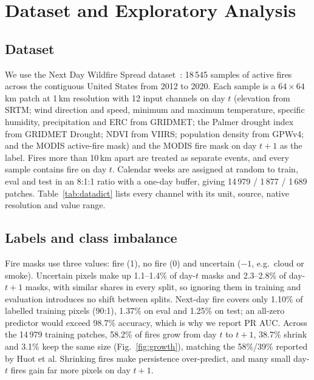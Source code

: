 
\section{Dataset and Exploratory Analysis}
\label{sec:dataset}

\subsection{Dataset}
We use the Next Day Wildfire Spread dataset~\cite{huot2022}: 18\,545 samples of active fires across
the contiguous United States from 2012 to 2020. Each sample is a $64\times64$\,km patch at 1\,km
resolution with 12 input channels on day $t$ (elevation from SRTM; wind direction and speed, minimum
and maximum temperature, specific humidity, precipitation and ERC from GRIDMET; the Palmer drought
index from GRIDMET Drought; NDVI from VIIRS; population density from GPWv4; and the MODIS active-fire
mask) and the MODIS fire mask on day $t+1$ as the label. Fires more than 10\,km apart are treated as
separate events, and every sample contains fire on day $t$. Calendar weeks are assigned at random
to train, eval and test in an 8:1:1 ratio with a one-day buffer, giving 14\,979 / 1\,877 / 1\,689 patches.
Table~\ref{tab:datadict} lists every channel with its unit, source, native resolution and value range.



\subsection{Labels and class imbalance}
Fire masks use three values: fire (1), no fire (0) and uncertain ($-1$, e.g.\ cloud or smoke).
Uncertain pixels make up 1.1--1.4\% of day-$t$ masks and 2.3--2.8\% of day-$t{+}1$ masks, with
similar shares in every split, so ignoring them in training and evaluation introduces no shift
between splits. Next-day fire covers only 1.10\% of labelled training pixels (90:1), 1.37\% on eval
and 1.25\% on test; an all-zero predictor would exceed 98.7\% accuracy, which is why we report
PR AUC. Across the 14\,979 training patches, 58.2\% of fires grow from day $t$ to $t+1$, 38.7\% shrink and 3.1\% keep
the same size (Fig.~\ref{fig:growth}), matching the 58\%/39\% reported by Huot et al.
Shrinking fires make persistence over-predict, and many small day-$t$ fires gain far more pixels
on day $t+1$.

